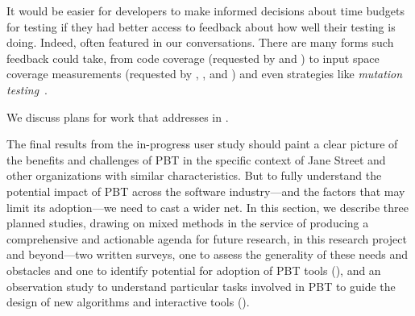 It would be easier for developers to make informed decisions about
time budgets for testing if
they had better access to feedback about how well their testing is doing.
Indeed,  often featured in our
conversations.
There are many forms such feedback could take, from code coverage (requested by
 and ) to input space coverage measurements
(requested by , , and ) and even
strategies like {\em mutation
  testing}~\cite{papadakis_mutation_2018}.

We discuss plans for work that addresses  in .

\iflater
{}
\fi

\ifdesperateforspace
{}
  \fi

\label{sec:foundation}


The final results from the in-progress user study should paint a clear
picture of the benefits and challenges of PBT in the specific context
of Jane Street and other organizations with similar characteristics.  But to
fully understand the potential impact of PBT across the software
industry---and the factors that may limit its adoption---we need to
cast a wider net.
%
In this section, we describe three planned studies, drawing on mixed
methods in the service of producing a comprehensive and actionable
agenda for future research, in this research project and beyond---two
written surveys, one to assess the generality of these needs and obstacles
and one to identify potential for adoption of PBT tools
(), and an observation study to understand
particular tasks involved in PBT to guide the design of new algorithms
and interactive tools ().

